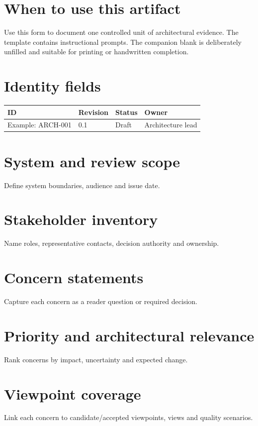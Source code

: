 \documentclass[10pt,letterpaper]{article}
\begin{document}
\DocProvenance
\section{When to use this artifact}
Use this form to document one controlled unit of architectural evidence. The template contains instructional prompts. The companion blank is deliberately unfilled and suitable for printing or handwritten completion.

\section{Identity fields}
\small
\begin{tabularx}{\linewidth}{@{}YYYY@{}}
\toprule
\textbf{ID} & \textbf{Revision} & \textbf{Status} & \textbf{Owner} \\
\midrule
Example: ARCH-001 & 0.1 & Draft & Architecture lead \\
\bottomrule
\end{tabularx}
\normalsize
\section{System and review scope}
Define system boundaries, audience and issue date.

\section{Stakeholder inventory}
Name roles, representative contacts, decision authority and ownership.

\section{Concern statements}
Capture each concern as a reader question or required decision.

\section{Priority and architectural relevance}
Rank concerns by impact, uncertainty and expected change.

\section{Viewpoint coverage}
Link each concern to candidate/accepted viewpoints, views and quality scenarios.
\end{document}
